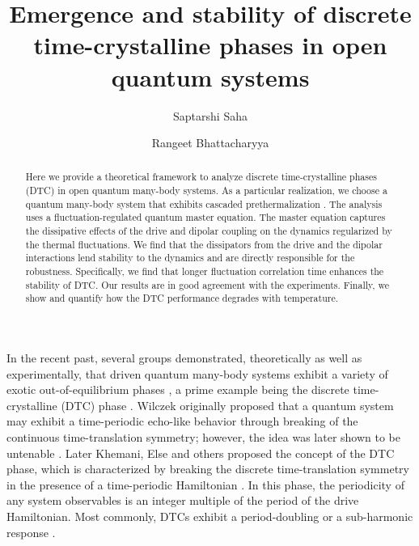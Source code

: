 \documentclass[prl,aps,twocolumn,floatfix]{revtex4-1}
\begin{document}
\title{Emergence and stability of discrete time-crystalline phases in open quantum systems}
\author{Saptarshi Saha}
\author{Rangeet Bhattacharyya}

\begin{abstract}

Here we provide a theoretical framework to analyze discrete time-crystalline phases (DTC) in open quantum
many-body systems. As a
particular realization, we choose a quantum many-body system that exhibits cascaded prethermalization . The analysis uses a fluctuation-regulated quantum master equation.  The master
equation captures the dissipative effects of the drive and dipolar coupling on the dynamics regularized by
the thermal fluctuations.  We find that the dissipators from the drive and the dipolar interactions lend
stability to the dynamics and are directly responsible for the robustness. Specifically, we find that longer
fluctuation correlation time enhances the stability of DTC. Our results are in good agreement with the
experiments. Finally, we show and quantify how the DTC performance degrades with temperature.

\end{abstract}

\maketitle

In the recent past, several groups demonstrated, theoretically as well as experimentally, that driven
quantum many-body systems exhibit a variety of exotic out-of-equilibrium phases \cite{Polkovnikov2011,
eisert_quantum_2015,abanin2017, ueda_2020,yao_discrete_2017}, a prime example being the
discrete time-crystalline (DTC) phase \cite{sacha_time_2018,khemani2019}. Wilczek originally proposed that a quantum system may exhibit a time-periodic echo-like behavior through breaking of the continuous time-translation symmetry; however, the idea was later shown to
be untenable \cite{bruno_impossibility_2013, watanabe_absence_2015}. Later Khemani, Else and
others proposed the concept of the DTC phase, which is characterized by breaking the discrete
time-translation symmetry in the presence of a time-periodic Hamiltonian \cite{Khemani2016,else_floquet_2016}. In this
phase, the periodicity of any system observables is an integer multiple of the period of the drive
Hamiltonian. Most commonly, DTCs exhibit a period-doubling or a sub-harmonic response
\cite{else_floquet_2016}.
\end{document}
